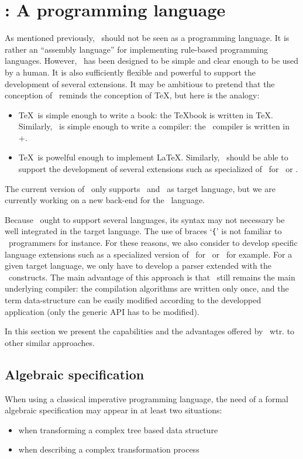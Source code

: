 \newpage
\section{\TOM: A programming language}

As mentioned previously, \TOM\ should not be seen as a programming
language. It is rather an ``assembly language'' for implementing
rule-based programming languages. 
However, \TOM\ has been designed to be simple and clear enough
to be used by a human. It is also sufficiently flexible and powerful
to support the development of several extensions.
It may be ambitious to pretend that the conception of \TOM\ reminds
the conception of \TeX, but here is the analogy:
\begin{itemize}
\item \TeX\ is simple enough to write a book: the {\TeX}book is
  written in \TeX.
  Similarly, \TOM\ is simple enough to write a compiler: the \TOM\
  compiler is written in \Java+\TOM.
\item \TeX\ is powelful enough to implement \LaTeX. 
  Similarly, \TOM\ should be able to support the development of
  several extensions such as specialized of \TOM\ for \Java\ or \Eiffel.
\end{itemize}

The current version of \TOM\ only supports \C\ and \Java\ as target
language, but we are currently working on a new back-end for the
\Eiffel\ language.

Because \TOM\ ought to support several languages, its syntax may
not necessary be well integrated in the target language. The use of
braces `\texttt{\{}' is not familiar to \Eiffel\ programmers for instance.
For these reasons, we also consider to develop specific language
extensions such as a specialized version of \TOM\ for \Java\ or \Eiffel\
for example. 
For a given target language, we only have to develop a parser extended
with the \TOM\ constructs.
The main advantage of this approach is that \TOM\ still remains the
main underlying compiler: the compilation algorithms are written only
once, and the term data-structure can be easily modified according to
the developped application (only the generic API has to be modified).

In this section we present the capabilities and the advantages
offered by \TOM\ wtr. to other similar approaches.

\subsection{Algebraic specification}
When using a classical imperative programming language, the need of
a formal algebraic specification may appear in at least two
situations: 
\begin{itemize}
\item when transforming a complex tree based data structure
\item when describing a complex transformation process
\end{itemize}

